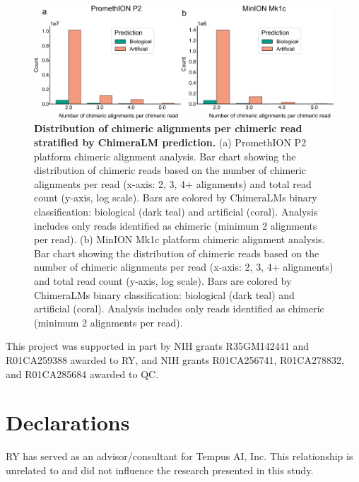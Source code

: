\documentclass[pdflatex,sn-nature]{sn-jnl}%
\theoremstyle{thmstyleone}%
\theoremstyle{thmstyletwo}%
\theoremstyle{thmstylethree}%
\begin{document}
\begin{figure}[!ht]
	\begin{center}
		\includegraphics[width=\textwidth]{final_figures/sf2}
	\end{center}
	\caption{{\bf Distribution of chimeric alignments per chimeric read stratified by ChimeraLM prediction.}
		(a) PromethION P2 platform chimeric alignment analysis. Bar chart showing the distribution of chimeric reads based on the number of chimeric alignments per read (x-axis: 2, 3, 4+ alignments) and total read count (y-axis, log scale). Bars are colored by ChimeraLM\textquotesingle s binary classification: biological (dark teal) and artificial (coral). Analysis includes only reads identified as chimeric (minimum 2 alignments per read).
		(b) MinION Mk1c platform chimeric alignment analysis. Bar chart showing the distribution of chimeric reads based on the number of chimeric alignments per read (x-axis: 2, 3, 4+ alignments) and total read count (y-axis, log scale). Bars are colored by ChimeraLM\textquotesingle s binary classification: biological (dark teal) and artificial (coral). Analysis includes only reads identified as chimeric (minimum 2 alignments per read). }\label{fig:sf2}
\end{figure}


This project was supported in part by NIH grants R35GM142441 and R01CA259388 awarded to RY, and NIH grants R01CA256741, R01CA278832, and R01CA285684 awarded to QC.

\section*{Declarations}





RY has served as an advisor/consultant for Tempus AI, Inc. This relationship is unrelated to and did not influence the research presented in this study.
\end{document}
